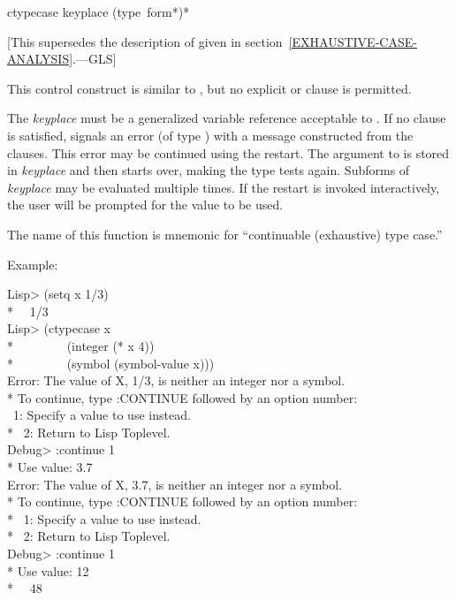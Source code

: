 \begin{defmac}
ctypecase keyplace {(type {\,form}*)}*

   [This supersedes the description of 
   given in section~\ref{EXHAUSTIVE-CASE-ANALYSIS}.---GLS]

  This control construct is similar to , but no explicit 
   or  clause is permitted.

  The \emph{keyplace} must be a generalized variable reference acceptable to .
  If no clause is satisfied,  signals an error (of type )
  with a message constructed from the clauses. This error may be continued
  using the  restart. The argument to  is stored in
  \emph{keyplace} and then  starts over, making the type tests again. 
  Subforms of \emph{keyplace} may be evaluated multiple times. If the 
  restart is invoked interactively, the user will be prompted for the value
  to be used.
  
  The name of this function is mnemonic for ``continuable (exhaustive) 
  type case.''


  Example:
\begin{lisp}
Lisp> (setq x 1/3) \\*
~\EV\ 1/3 \\
Lisp> (ctypecase x \\*
~~~~~~~~(integer (* x 4)) \\*
~~~~~~~~(symbol (symbol-value x))) \\
Error: The value of X, 1/3, is neither an integer nor a symbol. \\*
To continue, type :CONTINUE followed by an option number: \\
~1: Specify a value to use instead. \\*
~2: Return to Lisp Toplevel. \\
Debug> :continue 1 \\*
Use value: 3.7 \\
Error: The value of X, 3.7, is neither an integer nor a symbol. \\*
To continue, type :CONTINUE followed by an option number: \\*
~1: Specify a value to use instead. \\*
~2: Return to Lisp Toplevel. \\
Debug> :continue 1 \\*
Use value: 12 \\*
~\EV\ 48
\end{lisp}
\end{defmac}


